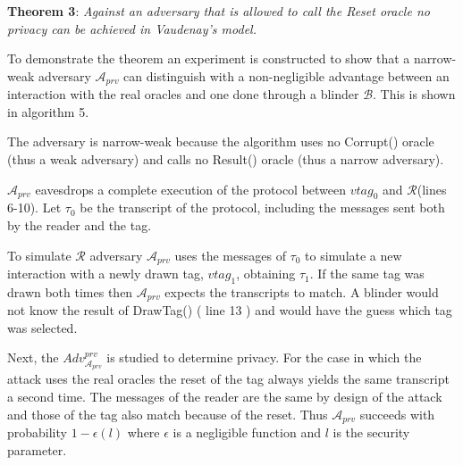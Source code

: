     \textbf{Theorem 3}: \textit{Against an adversary that is allowed to call the Reset oracle no privacy can be achieved in Vaudenay's model.}

    To demonstrate the theorem an experiment is constructed to show that a narrow-weak adversary $\mathcal{A}_{prv}$ can distinguish with a non-negligible advantage 
    between an interaction with the real oracles and one done through a blinder $\mathcal{B}$. This is shown in algorithm 5.
    
    The adversary is narrow-weak because the algorithm uses no Corrupt() oracle (thus a weak adversary) and calls no Result() oracle 
    (thus a narrow adversary).

    $\mathcal{A}_{prv}$ eavesdrops a complete execution of the protocol between $vtag_{0}$ and $\mathcal{R}$(lines 6-10). Let $\tau_{0}$ be the transcript of the protocol, including the messages
    sent both by the reader and the tag.

    To simulate $\mathcal{R}$ adversary $\mathcal{A}_{prv}$ uses the messages of $\tau_{0}$ to simulate a new interaction with a newly drawn tag, $vtag_{1}$, obtaining $\tau_{1}$. If the same tag was
    drawn both times then $\mathcal{A}_{prv}$ expects the transcripts to match. A blinder would not know the result of DrawTag() ( line 13 ) and would have the guess which tag was
    selected. 
    
    Next, the $Adv_{\mathcal{A}_{prv}}^{prv}$ is studied to determine privacy. For the case in which the attack uses the real oracles the reset of the tag always yields the same transcript a second time. 
    The messages of the reader are the same by design of the attack and those of the tag also match because of the reset. Thus $\mathcal{A}_{prv}$ succeeds with probability $1-\epsilon(l)$
    where $\epsilon$ is a negligible function and $l$ is the security parameter.

